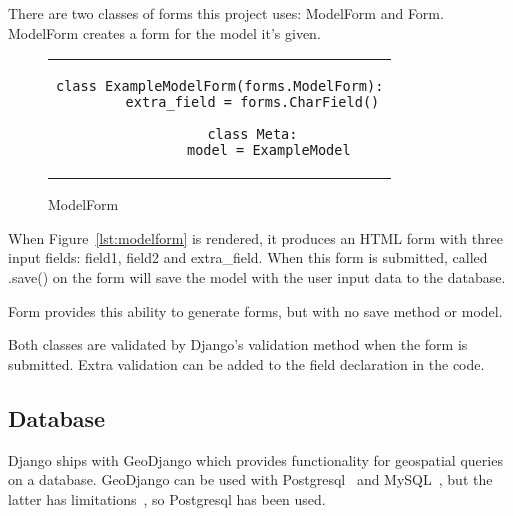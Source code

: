 There are two classes of forms this project uses: ModelForm and Form. ModelForm creates a form for the model it's given.

\begin{figure}[thp]
	\centering
	\begin{tabular}{c}
	\begin{lstlisting}[label={lst:modelform}]
	class ExampleModelForm(forms.ModelForm):
		extra_field = forms.CharField()

		class Meta:
			model = ExampleModel
	\end{lstlisting}
	\end{tabular}
	\caption{ModelForm}
\end{figure}

When Figure~\ref{lst:modelform} is rendered, it produces an HTML form with three input fields: field1, field2 and extra\_field. When this form is submitted, called .save() on the form will save the model with the user input data to the database.

Form provides this ability to generate forms, but with no save method or model.

Both classes are validated by Django's validation method when the form is submitted. Extra validation can be added to the field declaration in the code.

\subsection{Database}
\label{sec:web:database}

Django ships with GeoDjango which provides functionality for geospatial queries on a database. GeoDjango can be used with Postgresql~\cite{postgresql} and MySQL~\cite{mysql}, but the latter has limitations~\cite{mysqllims}, so Postgresql has been used.